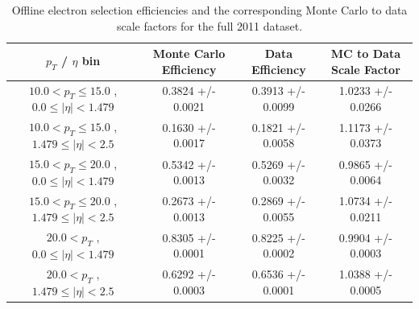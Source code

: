  \begin{table}[!ht]
 \begin{center} 
 \begin{tabular}{|c|c|c|c|}
 \hline
 $p_{T}$ / $\eta$ bin    &  Monte Carlo Efficiency    &  Data Efficiency   &  MC to Data Scale Factor \\   \hline           
$ 10.0 < p_{T} \le  15.0$ , $  0.0  \le |\eta| <   1.479$   &       0.3824 +/- 0.0021   &       0.3913 +/- 0.0099   &       1.0233 +/- 0.0266   \\   
\hline
$ 10.0 < p_{T} \le  15.0$ , $  1.479  \le |\eta| <   2.5$   &       0.1630 +/- 0.0017   &       0.1821 +/- 0.0058   &       1.1173 +/- 0.0373   \\   
\hline
$ 15.0 < p_{T} \le  20.0$ , $  0.0  \le |\eta| <   1.479$   &       0.5342 +/- 0.0013   &       0.5269 +/- 0.0032   &       0.9865 +/- 0.0064   \\   
\hline
$ 15.0 < p_{T} \le  20.0$ , $  1.479  \le |\eta| <   2.5$   &       0.2673 +/- 0.0013   &       0.2869 +/- 0.0055   &       1.0734 +/- 0.0211   \\   
\hline
$ 20.0 < p_{T} $ , $  0.0  \le |\eta| <   1.479$   &       0.8305 +/- 0.0001   &       0.8225 +/- 0.0002   &       0.9904 +/- 0.0003   \\   
\hline
$ 20.0 < p_{T} $ , $  1.479  \le |\eta| <   2.5$   &       0.6292 +/- 0.0003   &       0.6536 +/- 0.0001   &       1.0388 +/- 0.0005   \\   
\hline
\end{tabular}
\caption{Offline electron selection efficiencies and the corresponding Monte Carlo to data scale factors for the
full 2011 dataset.}
\label{tab:eff_ele_offline_Full2011}
\end{center}
\end{table}



